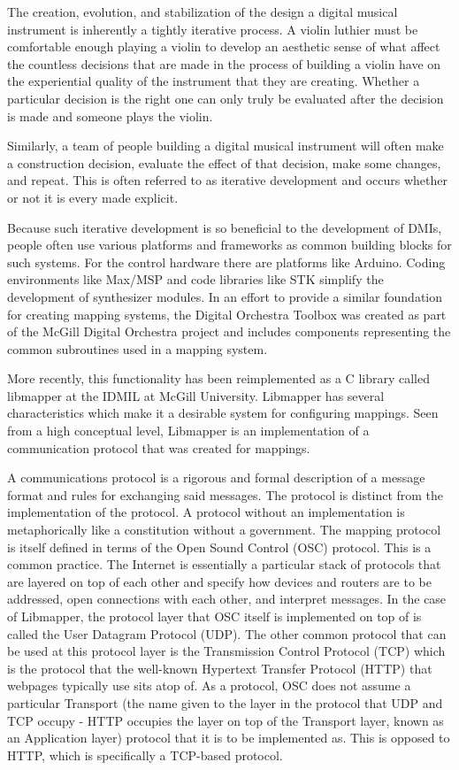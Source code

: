 The creation, evolution, and stabilization of the design a digital musical instrument is inherently a tightly iterative process. A violin luthier must be comfortable enough playing a violin to develop an aesthetic sense of what affect the countless decisions that are made in the process of building a violin have on the experiential quality of the instrument that they are creating. Whether a particular decision is the right one can only truly be evaluated after the decision is made and someone plays the violin. 

Similarly, a team of people building a digital musical instrument will often make a construction decision, evaluate the effect of that decision, make some changes, and repeat. This is often referred to as iterative development and occurs whether or not it is every made explicit. 

Because such iterative development is so beneficial to the development of DMIs, people often use various platforms and frameworks as common building blocks for such systems. For the control hardware there are platforms like Arduino. Coding environments like Max/MSP and code libraries like STK simplify the development of synthesizer modules. In an effort to provide a similar foundation for creating mapping systems, the Digital Orchestra Toolbox was created as part of the McGill Digital Orchestra project and includes components representing the common subroutines used in a mapping system. 

More recently, this functionality has been reimplemented as a C library called libmapper at the IDMIL at McGill University. Libmapper has several characteristics which make it a desirable system for configuring mappings. Seen from a high conceptual level, Libmapper is an implementation of a communication protocol that was created for mappings. 

A communications protocol is a rigorous and formal description of a message format and rules for exchanging said messages. The protocol is distinct from the implementation of the protocol. A protocol without an implementation is metaphorically like a constitution without a government. The mapping protocol is itself defined in terms of the Open Sound Control (OSC) protocol. This is a common practice. The Internet is essentially a particular stack of protocols that are layered on top of each other and specify how devices and routers are to be addressed, open connections with each other, and interpret messages. In the case of Libmapper, the protocol layer that OSC itself is implemented on top of is called the User Datagram Protocol (UDP). The other common protocol that can be used at this protocol layer is the Transmission Control Protocol (TCP) which is the protocol that the well-known Hypertext Transfer Protocol (HTTP) that webpages typically use sits atop of. As a protocol, OSC does not assume a particular Transport (the name given to the layer in the protocol that UDP and TCP occupy - HTTP occupies the layer on top of the Transport layer, known as an Application layer) protocol that it is to be implemented as. This is opposed to HTTP, which is specifically a TCP-based protocol.

